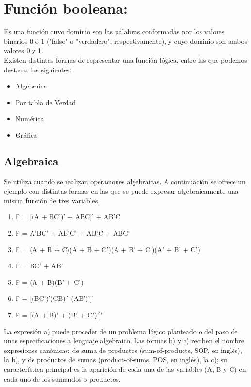\documentclass{article}
\begin{document}
        \section{\textbf{Función booleana:}}
            Es una función cuyo dominio son las palabras conformadas por los valores binarios 0 ó 1 ("falso" o "verdadero", respectivamente), y cuyo dominio son ambos valores 0 y 1.\\
            Existen distintas formas de representar una función lógica, entre las que podemos destacar las siguientes:
            \begin{itemize}
            \item Algebraica
            \item Por tabla de Verdad
            \item Numérica
            \item Gráfica
            \end{itemize}
            \subsection{\textbf{Algebraica}}
                Se utiliza cuando se realizan operaciones algebraicas. A continuación se ofrece un ejemplo con distintas formas en las que se puede expresar algebraicamente una misma función de tres variables.
                \begin{enumerate}[$a)$]
                \item F = [(A + BC’)’ + ABC]’ + AB’C
                \item F = A’BC’ + AB’C’ + AB’C + ABC’
                \item F = (A + B + C)(A + B + C’)(A + B’ + C’)(A’ + B’ + C’)
                \item F = BC’ + AB’
                \item F = (A + B)(B’ + C’)
                \item F = [(BC’)’(CB)´ (AB’)’]’
                \item F = [(A + B)’ + (B’ + C’)’]’
                \end{enumerate}
                La expresión a) puede proceder de un problema lógico planteado o del paso de unas especificaciones a lenguaje algebraico. Las formas b) y c) reciben el nombre expresiones canónicas: de suma de productos (sum-of-products, SOP, en inglés), la b), y de productos de sumas (product-of-sums, POS, en inglés), la c); su característica principal es la aparición de cada una de las variables (A, B y C) en cada uno de los sumandos o productos.\\
\end{document}
